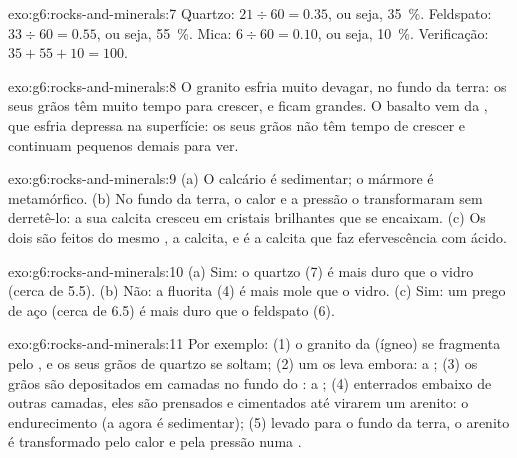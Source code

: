 \begin{solution}{exo:g6:rocks-and-minerals:7}
Quartzo: $21 \div 60 = 0.35$, ou seja, 35~\%. Feldspato: $33 \div 60 = 0.55$,
ou seja, 55~\%. Mica: $6 \div 60 = 0.10$, ou seja, 10~\%. Verificação:
$35 + 55 + 10 = 100$.
\end{solution}

\begin{solution}{exo:g6:rocks-and-minerals:8}
O granito esfria muito devagar, no fundo da terra: os seus grãos têm muito
tempo para crescer, e ficam grandes. O basalto vem da , que esfria
depressa na superfície: os seus grãos não têm tempo de crescer e continuam
pequenos demais para ver.
\end{solution}

\begin{solution}{exo:g6:rocks-and-minerals:9}
(a) O calcário é sedimentar; o mármore é metamórfico. (b) No fundo da
terra, o calor e a pressão o transformaram sem derretê-lo: a sua calcita
cresceu em cristais brilhantes que se encaixam. (c) Os dois são feitos do
mesmo , a calcita, e é a calcita que faz efervescência com ácido.
\end{solution}

\begin{solution}{exo:g6:rocks-and-minerals:10}
(a) Sim: o quartzo (7) é mais duro que o vidro (cerca de 5.5). (b) Não: a
fluorita (4) é mais mole que o vidro. (c) Sim: um prego de aço (cerca de
6.5) é mais duro que o feldspato (6).
\end{solution}

\begin{solution}{exo:g6:rocks-and-minerals:11}
Por exemplo: (1) o granito da  (ígneo) se fragmenta pelo
, e os seus grãos de quartzo se soltam; (2) um  os leva
embora: a ; (3) os grãos são depositados em camadas no fundo do :
a ; (4) enterrados embaixo de outras camadas, eles são prensados
e cimentados até virarem um arenito: o endurecimento (a  agora é
sedimentar); (5) levado para o fundo da terra, o arenito é transformado
pelo calor e pela pressão numa .
\end{solution}

